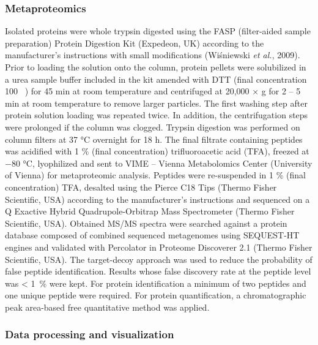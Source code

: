 \documentclass[12pt,]{article}
\begin{document}
\hypertarget{metaproteomics}{%
\subsubsection{Metaproteomics}\label{metaproteomics}}

Isolated proteins were whole trypsin digested using the FASP
(filter-aided sample preparation) Protein Digestion Kit (Expedeon, UK)
according to the manufacturer's instructions with small modifications
(Wiśniewski \emph{et al.}, 2009). Prior to loading the solution onto the
column, protein pellets were solubilized in a urea sample buffer
included in the kit amended with DTT (final concentration 100
\si{\milli\Molar}) for 45 \si{\minute} at room temperature and
centrifuged at 20,000 × g for 2 -- 5 \si{\minute} at room temperature to
remove larger particles. The first washing step after protein solution
loading was repeated twice. In addition, the centrifugation steps were
prolonged if the column was clogged. Trypsin digestion was performed on
column filters at 37 \si{\degreeCelsius} overnight for 18 \si{\hour}.
The final filtrate containing peptides was acidified with 1
\si{\percent} (final concentration) trifluoroacetic acid (TFA), freezed
at \num{-80} \si{\degreeCelsius}, lyophilized and sent to VIME -- Vienna
Metabolomics Center (University of Vienna) for metaproteomic analysis.
Peptides were re-suspended in 1 \si{\percent} (final concentration) TFA,
desalted using the Pierce C18 Tips (Thermo Fisher Scientific, USA)
according to the manufacturer's instructions and sequenced on a Q
Exactive Hybrid Quadrupole-Orbitrap Mass Spectrometer (Thermo Fisher
Scientific, USA). Obtained MS/MS spectra were searched against a protein
database composed of combined sequenced metagenomes using SEQUEST-HT
engines and validated with Percolator in Proteome Discoverer 2.1 (Thermo
Fisher Scientific, USA). The target-decoy approach was used to reduce
the probability of false peptide identification. Results whose false
discovery rate at the peptide level was \SI{< 1}{\percent} were kept.
For protein identification a minimum of two peptides and one unique
peptide were required. For protein quantification, a chromatographic
peak area-based free quantitative method was applied.

\hypertarget{data-processing-and-visualization}{%
\subsubsection{Data processing and
visualization}\label{data-processing-and-visualization}}
\end{document}
